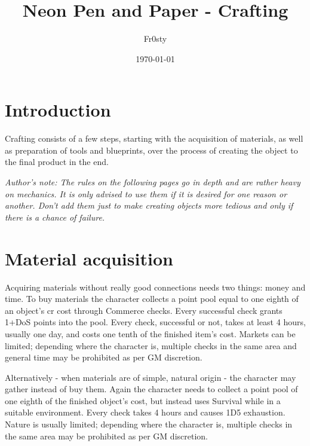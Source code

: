 \documentclass[12pt,a4paper,openany]{book}
\title{Neon Pen and Paper - Crafting}
\author{Fr0sty}
\date{\today}
\begin{document}
	

	\chapter{Introduction}
	Crafting consists of a few steps, starting with the acquisition of materials, as well as preparation of tools and blueprints, over the process of creating the object to the final product in the end.\par
	\vspace{5mm}
	\textit{Author's note: The rules on the following pages go in depth and are rather heavy on mechanics. It is only advised to use them if it is desired for one reason or another. Don't add them just to make creating objects more tedious and only if there is a chance of failure.}
	
	\chapter{Material acquisition}
	Acquiring materials without really good connections needs two things: money and time. To buy materials the character collects a point pool equal to one eighth of an object’s cr cost through Commerce checks. Every successful check grants 1+DoS points into the pool. Every check, successful or not, takes at least 4 hours, usually one day, and costs one tenth of the finished item’s cost. Markets can be limited; depending where the character is, multiple checks in the same area and general time may be prohibited as per GM discretion. \par
	Alternatively - when materials are of simple, natural origin - the character may gather instead of buy them. Again the character needs to collect a point pool of one eighth of the finished object's cost, but instead uses Survival while in a suitable environment. Every check takes 4 hours and causes 1D5 exhaustion. Nature is usually limited; depending where the character is, multiple checks in the same area may be prohibited as per GM discretion.
	
\end{document}
